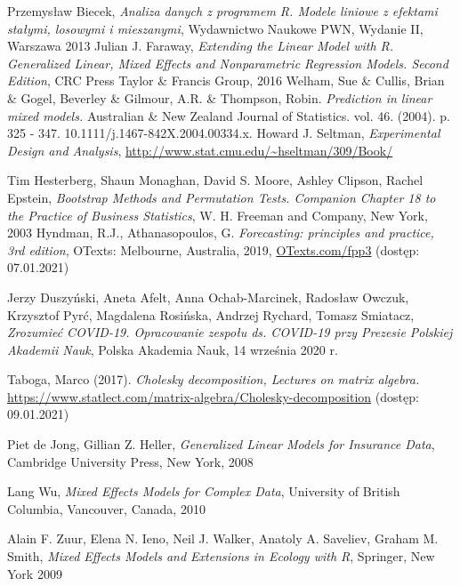 \documentclass[12pt]{mwbk}
\theoremstyle{plain}
\theoremstyle{definition}
\theoremstyle{remark}
\begin{document}
\begin{thebibliography}{99}



 Przemysław Biecek, \emph{Analiza danych z programem R. Modele liniowe z efektami stałymi, losowymi i mieszanymi}, Wydawnictwo Naukowe PWN, Wydanie II, Warszawa 2013
 Julian J. Faraway, \emph{Extending the Linear Model with R. Generalized Linear, Mixed Effects and Nonparametric Regression Models. Second Edition}, CRC Press Taylor \& Francis  Group, 2016
 Welham, Sue \& Cullis, Brian \& Gogel, Beverley \& Gilmour, A.R. \& Thompson, Robin. \emph{Prediction in linear mixed models.} Australian \& New Zealand Journal of Statistics. vol. 46.  (2004). p.  325 - 347. 10.1111/j.1467-842X.2004.00334.x. 
 Howard J. Seltman, \emph{Experimental Design and Analysis}, \url{http://www.stat.cmu.edu/~hseltman/309/Book/}

 Tim Hesterberg, Shaun Monaghan, David S. Moore, Ashley Clipson, Rachel Epstein, \emph{Bootstrap Methods and Permutation Tests. Companion Chapter 18 to the Practice of Business Statistics}, W. H. Freeman and Company, New York, 2003
 Hyndman, R.J.,  Athanasopoulos, G. \emph{Forecasting: principles and practice, 3rd edition}, OTexts: Melbourne, Australia, 2019, \url{OTexts.com/fpp3} (dostęp: 07.01.2021)

 Jerzy Duszyński, Aneta Afelt, Anna Ochab-Marcinek,
Radosław Owczuk, Krzysztof Pyrć, Magdalena Rosińska,
Andrzej Rychard, Tomasz Smiatacz, \emph{Zrozumieć COVID-19. Opracowanie zespołu ds. COVID-19 przy Prezesie Polskiej Akademii Nauk}, Polska Akademia Nauk, 14 września 2020 r.

 Taboga, Marco (2017). \emph{Cholesky decomposition, Lectures on matrix algebra.} \url{https://www.statlect.com/matrix-algebra/Cholesky-decomposition} (dostęp: 09.01.2021)

 Piet de Jong, Gillian Z. Heller, \emph{Generalized Linear Models for Insurance Data}, Cambridge University Press, New York, 2008

 Lang Wu, \emph{Mixed Effects Models for Complex Data}, University of British Columbia, Vancouver, Canada, 2010

 Alain F. Zuur, Elena N. Ieno, Neil J. Walker,
Anatoly A. Saveliev, Graham M. Smith, \emph{Mixed Effects Models and Extensions in Ecology with R}, Springer, New York 2009


\end{thebibliography}
\end{document}
